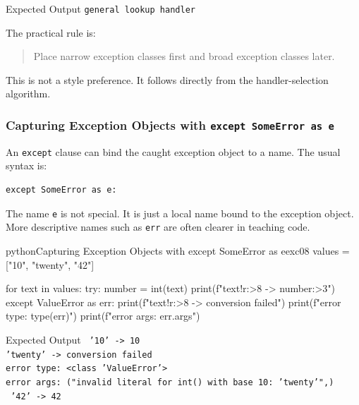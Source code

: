 \documentclass[a4paper,twoside]{report}
\begin{document}
\begin{iobox}{Expected Output}
\texttt{general lookup handler} \\
\end{iobox}


The practical rule is:

\begin{quote}
Place narrow exception classes first and broad exception classes later.
\end{quote}

This is not a style preference. It follows directly from the handler-selection algorithm.

\subsubsection{Capturing Exception Objects with \texttt{except SomeError as e}}

An \texttt{except} clause can bind the caught exception object to a name. The usual syntax is:

\begin{verbatim}
except SomeError as e:
\end{verbatim}

The name \texttt{e} is not special. It is just a local name bound to the exception object. More descriptive names such as \texttt{err} are often clearer in teaching code.

\begin{codebox}[]{python}{Capturing Exception Objects with except SomeError as e}{exc08}
values = ["10", "twenty", "42"]

for text in values:
    try:
        number = int(text)
        print(f"{text!r:>8} -> {number:>3}")
    except ValueError as err:
        print(f"{text!r:>8} -> conversion failed")
        print(f"error type: {type(err)}")
        print(f"error args: {err.args}")
\end{codebox}


\begin{iobox}{Expected Output}
\texttt{    '10' ->  10} \\
\texttt{'twenty' -> conversion failed} \\
\texttt{error type: <class 'ValueError'>} \\
\texttt{error args: ("invalid literal for int() with base 10: 'twenty'",)} \\
\texttt{    '42' ->  42} \\
\end{iobox}
\end{document}
